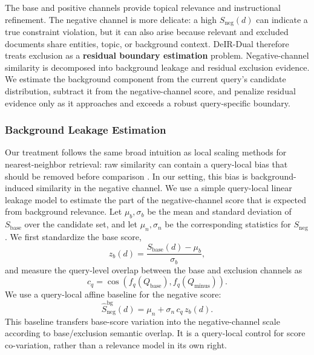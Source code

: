 \documentclass[letterpaper]{article}
\newcommand{\method}{DeIR-Dual}
\newcommand{\qbase}{Q_{\text{base}}}
\newcommand{\qminus}{Q_{\text{minus}}}
\newcommand{\sbase}{S_{\text{base}}}
\newcommand{\sneg}{S_{\text{neg}}}
\begin{document}
The base and positive channels provide topical relevance and
instructional refinement.  The negative channel is more delicate: a
high $\sneg(d)$ can indicate a true constraint violation, but it can
also arise because relevant and excluded documents share entities,
topic, or background context.  \method{} therefore treats exclusion as
a \textbf{residual boundary estimation} problem.  Negative-channel
similarity is decomposed into background leakage and residual exclusion
evidence.  We estimate the background component from the current
query's candidate distribution, subtract it from the negative-channel
score, and penalize residual evidence only as it approaches and exceeds
a robust query-specific boundary.

\subsubsection{Background Leakage Estimation}

Our treatment follows the same broad intuition as local scaling methods
for nearest-neighbor retrieval: raw similarity can contain a query-local
bias that should be removed before comparison
\cite{conneau2018wordtranslation}.  In our setting, this bias is
background-induced similarity in the negative channel.  We use a simple
query-local linear leakage model to estimate the part of the
negative-channel score that is expected from background relevance.  Let
$\mu_b,\sigma_b$ be the mean and standard deviation of
$\sbase$ over the candidate set, and let $\mu_n,\sigma_n$ be the
corresponding statistics for $\sneg$.  We first standardize the base
score,
%
\begin{equation}
  z_b(d) =
    \frac{\sbase(d) - \mu_b}{\sigma_b},
  \label{eq:base-zscore}
\end{equation}
%
and measure the query-level overlap between the base and exclusion
channels as
%
\begin{equation}
  c_q = \cos(f_q(\qbase), f_q(\qminus)).
  \label{eq:query-overlap}
\end{equation}
%
We use a query-local affine baseline for the negative score:
%
\begin{equation}
  \widehat{S}^{\text{bg}}_{\text{neg}}(d)
    = \mu_n + \sigma_n\, c_q\, z_b(d).
  \label{eq:bg-estimate}
\end{equation}
%
This baseline transfers base-score variation into the negative-channel
scale according to base/exclusion semantic overlap.  It is a
query-local control for score co-variation, rather than a relevance
model in its own right.
\end{document}
